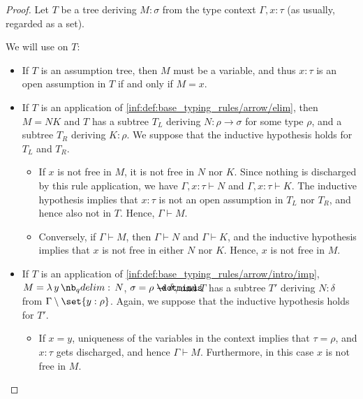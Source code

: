 \begin{proof}
   Let \( T \) be a tree deriving \( M: \sigma \) from the type context \( \Gamma, x: \tau \) (as usually, regarded as a set).

  We will use  on \( T \):
  \begin{itemize}
    \item If \( T \) is an assumption tree, then \( M \) must be a variable, and thus \( x: \tau \) is an open assumption in \( T \) if and only if \( M = x \).

    \item If \( T \) is an application of \ref{inf:def:base_typing_rules/arrow/elim}, then \( M = NK \) and \( T \) has a subtree \( T_L \) deriving \( N: \rho \to \sigma \) for some type \( \rho \), and a subtree \( T_R \) deriving \( K: \rho \). We suppose that the inductive hypothesis holds for \( T_L \) and \( T_R \).

    \begin{itemize}
      \item If \( x \) is not free in \( M \), it is not free in \( N \) nor \( K \). Since nothing is discharged by this rule application, we have \( \Gamma, x: \tau \vdash N \) and \( \Gamma, x: \tau \vdash K \). The inductive hypothesis implies that \( x: \tau \) is not an open assumption in \( T_L \) nor \( T_R \), and hence also not in \( T \). Hence, \( \Gamma \vdash M \).

      \item Conversely, if \( \Gamma \vdash M \), then \( \Gamma \vdash N \) and \( \Gamma \vdash K \), and the inductive hypothesis implies that \( x \) is not free in either \( N \) nor \( K \). Hence, \( x \) is not free in \( M \).
    \end{itemize}

    \item If \( T \) is an application of \ref{inf:def:base_typing_rules/arrow/intro/imp}, \( M = \qabs y N \), \( \sigma = \rho \synimplies \delta \), and \( T \) has a subtree \( T' \) deriving \( N: \delta \) from \( \Gamma \setminus \set{ y: \rho } \). Again, we suppose that the inductive hypothesis holds for \( T' \).

    \begin{itemize}
      \item If \( x = y \), uniqueness of the variables in the context implies that \( \tau = \rho \), and \( x: \tau \) gets discharged, and hence \( \Gamma \vdash M \). Furthermore, in this case \( x \) is not free in \( M \).


\end{itemize}
\end{itemize}
\end{proof}
